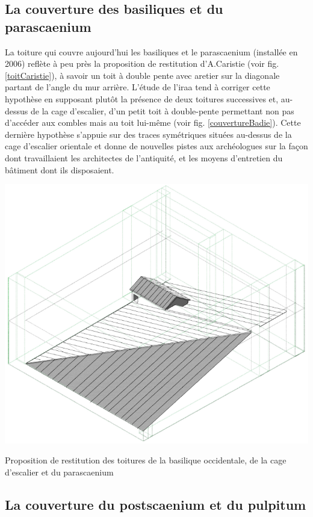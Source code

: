 	\subsection{La couverture des \glspl{basilique} et du \gls{parascaenium}}
	\label{couverture-basi}
		
		La toiture qui couvre aujourd'hui les \glspl{basilique} et le \gls{parascaenium} (installée en 2006) reflète à peu près la proposition de restitution d'A.Caristie (voir fig. \ref{toitCaristie}), à savoir un toit à double pente avec \gls{aretier} sur la diagonale partant de l'angle du mur arrière. L'étude de l'\gls{iraa} \cite[p. 36]{orangeTxt} tend à corriger cette hypothèse en supposant plutôt la présence de deux toitures successives et, au-dessus de la cage d’escalier, d’un petit toit à double-pente permettant non pas d’accéder aux combles mais au toit lui-même (voir fig. \ref{couvertureBadie}). Cette dernière hypothèse s'appuie sur des traces symétriques situées au-dessus de la cage d’escalier orientale et donne de nouvelles pistes aux archéologues sur la façon dont travaillaient les architectes de l'antiquité, et les moyens d'entretien du bâtiment dont ils disposaient. 
		
		\begin{figureth}
			\includegraphics[width=0.7\linewidth]{images/couvertureBadie}
			\caption[Toitures de basiliques par A.Badie]{Proposition de restitution des toitures de la \gls{basilique} occidentale, de la cage d'escalier et du \gls{parascaenium} \footnotemark}
			\label{couvertureBadie}
		\end{figureth}	
		
		\subsection{La couverture du \gls{postscaenium} et du \gls{pulpitum}} \label{couverture}
		
